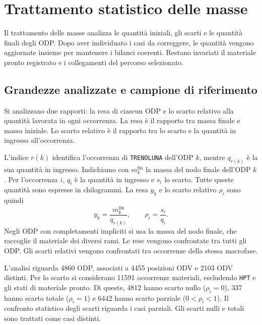 \section{Trattamento statistico delle masse}
\label{sec:statistical-mass-treatment}

Il trattamento delle masse analizza le quantità iniziali, gli scarti e le quantità finali degli ODP. Dopo aver individuato i casi da correggere, le quantità vengono aggiornate insieme per mantenere i bilanci coerenti. Restano invariati il materiale pronto registrato e i collegamenti del percorso selezionato.

\subsection{Grandezze analizzate e campione di riferimento}
\label{sec:mass-statistical-variables}

Si analizzano due rapporti: la resa di ciascun ODP e lo scarto relativo alla quantità lavorata in ogni occorrenza. La resa è il rapporto tra massa finale e massa iniziale. Lo scarto relativo è il rapporto tra lo scarto e la quantità in ingresso all'occorrenza.

L'indice $r(k)$ identifica l'occorrenza di \texttt{TRENOLUNA} dell'ODP $k$, mentre $q_{r(k)}$ è la sua quantità in ingresso. Indichiamo con $m_k^{\mathrm{fin}}$ la massa del nodo finale dell'ODP $k$. Per l'occorrenza $i$, $q_i$ è la quantità in ingresso e $s_i$ lo scarto. Tutte queste quantità sono espresse in chilogrammi. La resa $y_k$ e lo scarto relativo $\rho_i$ sono quindi
\begin{equation}
\label{eq:statistical-mass-ratios}
y_k=\frac{m_k^{\mathrm{fin}}}{q_{r(k)}},
\qquad
\rho_i=\frac{s_i}{q_i}.
\end{equation}
Negli ODP con completamenti impliciti si usa la massa del nodo finale, che raccoglie il materiale dei diversi rami. Le rese vengono confrontate tra tutti gli ODP. Gli scarti relativi vengono confrontati tra occorrenze della stessa macrofase.

L'analisi riguarda \num{4860} ODP, associati a \num{4455} posizioni ODV e \num{2103} ODV distinti. Per lo scarto si considerano \num{11591} occorrenze materiali, escludendo \texttt{HPT} e gli stati di materiale pronto. Di queste, \num{4812} hanno scarto nullo ($\rho_i=0$), 337 hanno scarto totale ($\rho_i=1$) e \num{6442} hanno scarto parziale ($0<\rho_i<1$). Il confronto statistico degli scarti riguarda i casi parziali. Gli scarti nulli e totali sono trattati come casi distinti.

